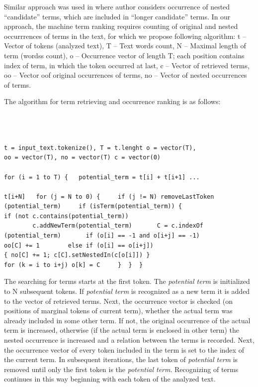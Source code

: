 \documentclass{llncs}%
\begin{document}
Similar approach was used in \cite{fahmi2005c} where author considers occurrence of nested “candidate” terms, which are included in “longer candidate” terms. In our approach, the machine term ranking requires counting of original and nested occurrrences of terms in the text, for which we propose following algorithm: t – Vector of tokens (analyzed text), T – Text words count, N – Maximal length of term (wordss count), o – Occurrence vector of length T; each position contains index of term, in which the token occurred at last, c – Vector of retrieved terms, oo – Vector oof original occurrences of terms, no – Vector of nested occurrences of terms. 

\begin{center}
The algorithm for term retrieving and occurrence ranking is as follows: 
\begin{verbatim}



t = input_text.tokenize(), T = t.lenght o = vector(T), 
oo = vector(T), no = vector(T) c = vector(0) 
 
for (i = 1 to T) {   potential_term = t[i] + t[i+1] ... 

t[i+N]   for (j = N to 0) {     if (j != N) removeLastToken
(potential_term)     if (isTerm(potential_term)) {
if (not c.contains(potential_term)) 
        c.addNewTerm(potential_term)       C = c.indexOf
(potential_term)       if (o[i] == -1 and o[i+j] == -1)  
oo[C] += 1        else if (o[i] == o[i+j])          
{ no[C] += 1; c[C].setNestedIn(c[o[i]]) }       
for (k = i to i+j) o[k] = C     }  }  } 
\end{verbatim}
\end{center}

The searching for terms starts at the first token. The \textit{potential term} is initialized to N subsequent tokens. If \textit{potential term} is recognized as a new term it is added to the vector of retrieved terms. Next, the occurrence vector is checked (on positions of marginal tokens of current term), whether the actual term was already included in some other term. If not, the original occurrence of the actual term is increased, otherwise (if the actual term is enclosed in other term) the nested occurrence is increased and a relation between the terms is recorded. Next, the occurrence vector of every token included in the term is set to the index of the current term. In subsequent iterations, the last token of \textit{potential term} is removed until only the first token is the \textit{potential term}. Recognizing of terms continues in this way beginning with each token of the analyzed text.
\end{document}
